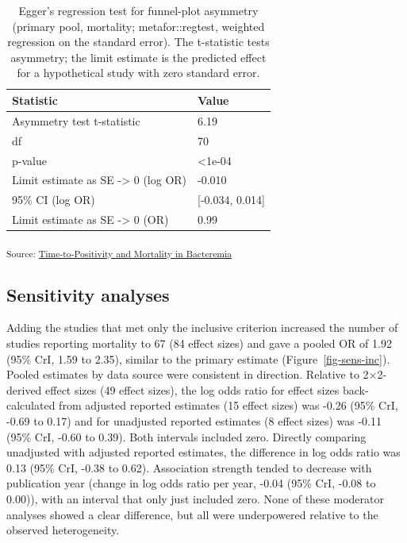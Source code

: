 \documentclass[
  11pt,
]{article}
\begin{document}
{

\begin{longtable}[]{@{}ll@{}}

\caption{\label{tbl-egger}Egger's regression test for funnel-plot
asymmetry (primary pool, mortality; metafor::regtest, weighted
regression on the standard error). The t-statistic tests asymmetry; the
limit estimate is the predicted effect for a hypothetical study with
zero standard error.}

\tabularnewline

\toprule\noalign{}
Statistic & Value \\
\midrule\noalign{}
\endhead
\bottomrule\noalign{}
\endlastfoot
Asymmetry test t-statistic & 6.19 \\
df & 70 \\
p-value & \textless1e-04 \\
Limit estimate as SE -\textgreater{} 0 (log OR) & -0.010 \\
95\% CI (log OR) & {[}-0.034, 0.014{]} \\
Limit estimate as SE -\textgreater{} 0 (OR) & 0.99 \\

\end{longtable}

}

\textsubscript{Source:
\href{https://lewis-id-lab.github.io/ttp-bacteremia-meta-analysis/notebooks/mortality-analysis-preview.html\#cell-tbl-egger}{Time-to-Positivity
and Mortality in Bacteremia}}

\subsection{Sensitivity analyses}\label{sensitivity-analyses}

Adding the studies that met only the inclusive criterion increased the
number of studies reporting mortality to 67 (84 effect sizes) and gave a
pooled OR of 1.92 (95\% CrI, 1.59 to 2.35), similar to the primary
estimate (Figure~\ref{fig-sens-inc}). Pooled estimates by data source
were consistent in direction. Relative to 2×2-derived effect sizes (49
effect sizes), the log odds ratio for effect sizes back-calculated from
adjusted reported estimates (15 effect sizes) was -0.26 (95\% CrI, -0.69
to 0.17) and for unadjusted reported estimates (8 effect sizes) was
-0.11 (95\% CrI, -0.60 to 0.39). Both intervals included zero. Directly
comparing unadjusted with adjusted reported estimates, the difference in
log odds ratio was 0.13 (95\% CrI, -0.38 to 0.62). Association strength
tended to decrease with publication year (change in log odds ratio per
year, -0.04 (95\% CrI, -0.08 to 0.00)), with an interval that only just
included zero. None of these moderator analyses showed a clear
difference, but all were underpowered relative to the observed
heterogeneity.
\end{document}
